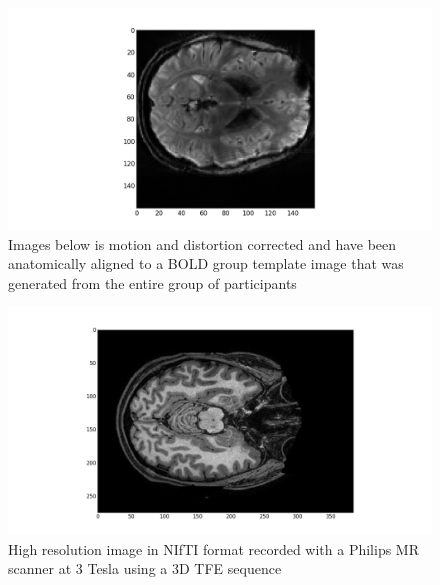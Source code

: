 \documentclass[11pt]{article}
\begin{document}
\begin{figure}[h]
\caption{Images below is motion and distortion corrected and have been
anatomically
aligned to a BOLD group template image that was generated from the entire group
of participants}
\includegraphics[scale=.5]{image_3}
\centering
\end{figure}
\begin{figure}[h]
\caption{High resolution image in NIfTI format recorded with a Philips MR
scanner at 3 Tesla using a 3D TFE sequence}
\includegraphics[scale=.4]{image_4}
\centering
\end{figure}


\end{document}
